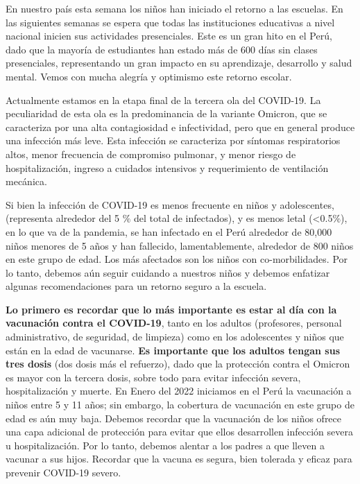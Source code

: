 \documentclass[12pt,a4paper,openany]{book}
\begin{document}
En nuestro país esta semana los niños han iniciado el retorno a las escuelas. En las siguientes semanas se espera que todas las instituciones educativas a nivel nacional inicien sus actividades presenciales. Este es un gran hito en el Perú, dado que la mayoría de estudiantes han estado  más de 600 días sin clases presenciales, representando un gran impacto en su aprendizaje, desarrollo y salud mental.  Vemos con mucha alegría y optimismo este retorno escolar.

Actualmente estamos en la etapa final de la tercera ola del COVID-19.  La peculiaridad de esta ola es la predominancia de la variante Omicron, que se caracteriza por una alta contagiosidad e infectividad, pero que en general produce una infección más leve. Esta infección se caracteriza por síntomas respiratorios altos, menor frecuencia de compromiso pulmonar, y menor riesgo de hospitalización, ingreso a cuidados intensivos y requerimiento de ventilación mecánica.  

Si bien  la infección de COVID-19 es menos frecuente en niños y adolescentes, (representa alrededor del 5 $\%$ del total de infectados), y es menos letal (<0.5$\%$), en lo que va de la pandemia, se han infectado en el Perú alrededor de 80,000 niños menores de 5 años y han fallecido, lamentablemente, alrededor  de 800 niños en este grupo de edad. Los más afectados son los niños con co-morbilidades. Por lo tanto, debemos aún seguir cuidando a nuestros niños y debemos  enfatizar algunas recomendaciones para un retorno seguro  a la escuela. 

\textbf{Lo primero es recordar que lo más importante es estar al día con la vacunación contra el COVID-19}, tanto en los adultos (profesores, personal administrativo, de seguridad, de limpieza) como en los adolescentes y niños que están en la edad de vacunarse.  \textbf{Es importante que los adultos tengan sus tres dosis} (dos dosis más el refuerzo), dado que la protección contra el Omicron es mayor con la tercera dosis, sobre todo para evitar infección severa, hospitalización y muerte. En Enero del 2022 iniciamos en el Perú la vacunación a niños entre 5 y 11 años; sin embargo, la cobertura de vacunación en este grupo de edad es aún muy baja. Debemos recordar que la vacunación de los niños ofrece una capa adicional de protección  para evitar que  ellos desarrollen infección severa u hospitalización. Por lo tanto, debemos alentar a los padres a que lleven a vacunar a sus hijos. Recordar que la vacuna es segura, bien tolerada y eficaz para prevenir COVID-19 severo.      
\end{document}
